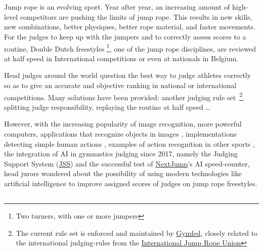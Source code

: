 
\chapter{}%
\label{ch:inleiding}

Jump rope is an evolving sport.
Year after year, an increasing amount of high-level competitors are pushing the limits of jump rope.
This results in new skills, new combinations, better physiques, better rope material, and faster movements. For the judges to keep up with the jumpers and to correctly assess scores to a routine, Double Dutch freestyles \footnote{Two turners, with one or more jumpers}, one of the jump rope disciplines, are reviewed at half speed in International competitions or even at nationals in Belgium.

Head judges around the world question the best way to judge athletes correctly so as to give an accurate and objective ranking in national or international competitions.
Many solutions have been provided: another judging rule set~\footnote{The current rule set is enforced and maintained by \href{https://www.gymfed.be/}{Gymfed}, closely related to the international judging-rules from the \href{https://ijru.sport/}{International Jump Rope Union}}, splitting judge responsibility, replaying the routine at half speed \dots

However, with the increasing popularity of image recognition, more powerful computers, applications that recognize objects in images \autocite{Singh_Gill_2022}, implementations detecting simple human actions \autocite{LUQMAN_2022}, examples of action recognition in other sports \autocite{Yin_2024}, the integration of AI in gymnastics judging since 2017, namely the Judging Support System (\href{https://www.gymnastics.sport/site/pages/judges-support.php}{JSS}) and the successful test of \href{https://nextjump.app/}{NextJump}'s AI speed-counter, head jurors wondered about the possibility of using modern technologies like artificial intelligence to improve assigned scores of judges on jump rope freestyles.

\section{}%
\label{sec:probleemstelling}

